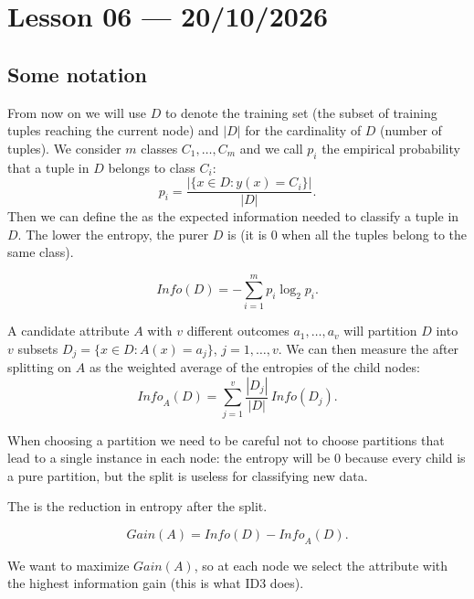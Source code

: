 \section{Lesson 06 --- 20/10/2026}

\subsection{Some notation}
From now on we will use $D$ to denote the training set (the subset of training tuples reaching the current node) and $|D|$ for the cardinality of $D$ (number of tuples). We consider $m$ classes $C_1,\dots,C_m$ and we call $p_i$ the empirical probability that a tuple in $D$ belongs to class $C_i$:
\[
  p_i = \frac{|\{x \in D : y(x) = C_i\}|}{|D|}.
\]
Then we can define the  as the expected information needed to classify a tuple in $D$. The lower the entropy, the purer $D$ is (it is $0$ when all the tuples belong to the same class).

\begin{definition}[Entropy]
  \[
    \mathit{Info}(D) = -\sum_{i=1}^{m} p_i \log_2 p_i .
  \]
\end{definition}

A candidate attribute $A$ with $v$ different outcomes $a_1,\dots,a_v$ will partition $D$ into $v$ subsets $D_j = \{x \in D : A(x) = a_j\}$, $j = 1,\dots,v$. We can then measure the  after splitting on $A$ as the weighted average of the entropies of the child nodes:
\[
  \mathit{Info}_A(D) = \sum_{j=1}^{v} \frac{|D_j|}{|D|}\, \mathit{Info}(D_j).
\]

When choosing a partition we need to be careful not to choose partitions that lead to a single instance in each node: the entropy will be $0$ because every child is a pure partition, but the split is useless for classifying new data.

The  is the reduction in entropy after the split.

\begin{definition}
  \[
    \mathit{Gain}(A) = \mathit{Info}(D) - \mathit{Info}_A(D).
  \]
\end{definition}

We want to maximize $\mathit{Gain}(A)$, so at each node we select the attribute with the highest information gain (this is what ID3 does).

